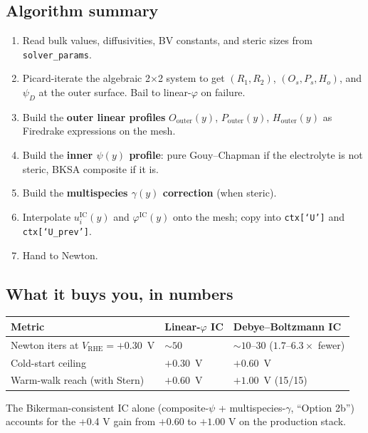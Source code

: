 \documentclass[11pt]{article}
\newcommand{\VRHE}{V_{\mathrm{RHE}}}
\begin{document}
\subsection{Algorithm summary}

\begin{enumerate}
\item Read bulk values, diffusivities, BV constants, and steric sizes
      from \texttt{solver\_params}.
\item Picard-iterate the algebraic 2$\times$2 system to get
      $(R_1, R_2)$, $(O_s, P_s, H_o)$, and $\psi_D$ at the outer
      surface. Bail to linear-$\varphi$ on failure.
\item Build the \textbf{outer linear profiles} $O_{\mathrm{outer}}(y)$,
      $P_{\mathrm{outer}}(y)$, $H_{\mathrm{outer}}(y)$ as Firedrake
      expressions on the mesh.
\item Build the \textbf{inner $\psi(y)$ profile}: pure Gouy--Chapman
      if the electrolyte is not steric, BKSA composite if it is.
\item Build the \textbf{multispecies $\gamma(y)$ correction} (when
      steric).
\item Interpolate $u_i^{\mathrm{IC}}(y)$ and $\varphi^{\mathrm{IC}}(y)$
      onto the mesh; copy into \texttt{ctx[`U']} and
      \texttt{ctx[`U\_prev']}.
\item Hand to Newton.
\end{enumerate}

\subsection{What it buys you, in numbers}

\begin{center}
\begin{tabular}{lll}
\toprule
\textbf{Metric} & \textbf{Linear-$\varphi$ IC} & \textbf{Debye--Boltzmann IC} \\
\midrule
Newton iters at $\VRHE = +0.30$~V & $\sim 50$ & $\sim 10$--30
   \;($1.7$--$6.3\times$ fewer) \\
Cold-start ceiling                & $+0.30$~V & $+0.60$~V \\
Warm-walk reach (with Stern)      & $+0.60$~V & $+1.00$~V (15/15) \\
\bottomrule
\end{tabular}
\end{center}

The Bikerman-consistent IC alone (composite-$\psi$ + multispecies-$\gamma$,
``Option 2b'') accounts for the +0.4 V gain from $+0.60$ to $+1.00$ V on
the production stack.
\end{document}
